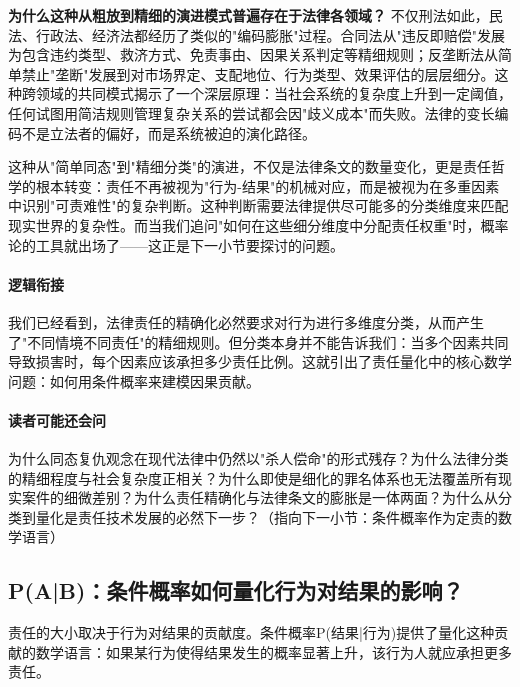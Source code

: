 \documentclass[../main.tex]{subfiles}
\begin{document}
	\textbf{为什么这种从粗放到精细的演进模式普遍存在于法律各领域？} 不仅刑法如此，民法、行政法、经济法都经历了类似的"编码膨胀"过程。合同法从"违反即赔偿"发展为包含违约类型、救济方式、免责事由、因果关系判定等精细规则；反垄断法从简单禁止"垄断"发展到对市场界定、支配地位、行为类型、效果评估的层层细分。这种跨领域的共同模式揭示了一个深层原理：当社会系统的复杂度上升到一定阈值，任何试图用简洁规则管理复杂关系的尝试都会因"歧义成本"而失败。法律的变长编码不是立法者的偏好，而是系统被迫的演化路径。
	
	这种从"简单同态"到"精细分类"的演进，不仅是法律条文的数量变化，更是责任哲学的根本转变：责任不再被视为"行为-结果"的机械对应，而是被视为在多重因素中识别"可责难性"的复杂判断。这种判断需要法律提供尽可能多的分类维度来匹配现实世界的复杂性。而当我们追问"如何在这些细分维度中分配责任权重"时，概率论的工具就出场了——这正是下一小节要探讨的问题。
	
	\paragraph*{逻辑衔接}

	我们已经看到，法律责任的精确化必然要求对行为进行多维度分类，从而产生了"不同情境不同责任"的精细规则。但分类本身并不能告诉我们：当多个因素共同导致损害时，每个因素应该承担多少责任比例。这就引出了责任量化中的核心数学问题：如何用条件概率来建模因果贡献。
	
	\paragraph*{读者可能还会问}

	为什么同态复仇观念在现代法律中仍然以"杀人偿命"的形式残存？为什么法律分类的精细程度与社会复杂度正相关？为什么即使是细化的罪名体系也无法覆盖所有现实案件的细微差别？为什么责任精确化与法律条文的膨胀是一体两面？为什么从分类到量化是责任技术发展的必然下一步？（指向下一小节：条件概率作为定责的数学语言）

	\subsection{P(A|B)：条件概率如何量化行为对结果的影响？}

	\begin{motivation}

		责任的大小取决于行为对结果的贡献度。条件概率P(结果|行为)提供了量化这种贡献的数学语言：如果某行为使得结果发生的概率显著上升，该行为人就应承担更多责任。

	\end{motivation}
	
\end{document}
